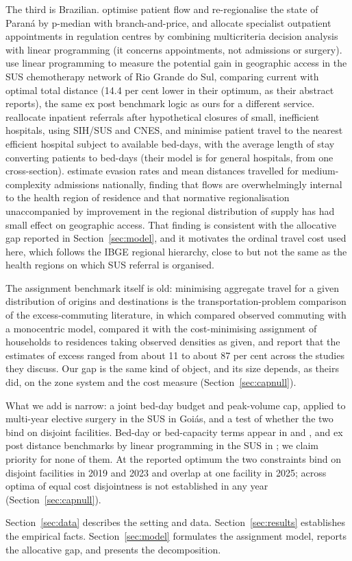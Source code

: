 The third is Brazilian. \citet{scarpin2008} optimise patient flow and
re-regionalise the state of Paran\'a by p-median with branch-and-price, and \citet{silva2010} allocate specialist
outpatient appointments in regulation centres by combining multicriteria decision analysis with linear programming
(it concerns appointments, not admissions or surgery). \citet{battesini2018} use linear programming to measure the potential gain in geographic access in the SUS chemotherapy network of Rio Grande do Sul, comparing current with optimal total distance (14.4 per cent lower in their optimum, as their abstract reports), the same ex post benchmark logic as ours for a different service. \citet{botega2022} reallocate inpatient referrals after hypothetical closures of small, inefficient hospitals, using SIH/SUS and CNES, and minimise patient travel to the nearest efficient hospital subject to available bed-days, with the average length of stay converting patients to bed-days (their model is for general hospitals, from one cross-section). \citet{ipea2022} estimate evasion
rates and mean distances travelled for medium-complexity admissions nationally,
finding that flows are overwhelmingly internal to the health region of residence
and that normative regionalisation unaccompanied by improvement in the regional
distribution of supply has had small effect on geographic access. That finding is
consistent with the allocative gap reported in
Section~\ref{sec:model}, and it motivates the ordinal travel cost used here,
which follows the IBGE regional hierarchy, close to but not the same as the health regions on which SUS referral is organised.

The assignment benchmark itself is old: minimising aggregate travel for a given distribution of origins and destinations is the
transportation-problem comparison of the excess-commuting literature, in which \citet{hamilton1982} compared observed commuting
with a monocentric model, \citet{white1988} compared it with the cost-minimising assignment of households to residences
taking observed densities as given, and \citet{smallsong1992} report that the estimates of excess ranged from about 11 to
about 87 per cent across the studies they discuss. Our gap is the same kind of object, and its size depends, as theirs did,
on the zone system and the cost measure (Section~\ref{sec:capnull}).

What we add is narrow: a joint bed-day budget and peak-volume cap, applied to multi-year elective surgery in the SUS in Goi\'as, and a
test of whether the two bind on disjoint facilities. Bed-day or bed-capacity terms appear in \citet{botega2022} and \citet{burdett2023}, and ex post distance benchmarks by linear programming in the SUS in \citet{battesini2018}; we claim priority for none of them. At the reported optimum the two constraints bind on disjoint facilities in 2019 and 2023 and overlap at one facility in 2025; across optima of equal cost disjointness is not established in any year (Section~\ref{sec:capnull}).

Section~\ref{sec:data} describes the setting and data.
Section~\ref{sec:results} establishes the empirical facts.
Section~\ref{sec:model} formulates the assignment model, reports the
allocative gap, and presents the decomposition.
